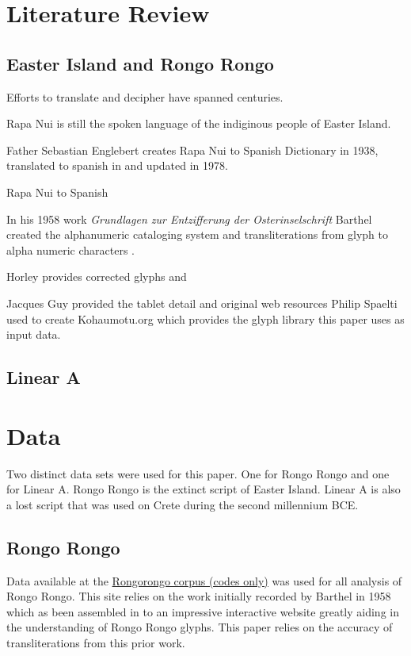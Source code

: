 \documentclass[preprint,12pt]{elsarticle}
\begin{document}
\section{Literature Review}
\label{lit}
\subsection{Easter Island and Rongo Rongo}
Efforts to translate and decipher have spanned centuries. 

Rapa Nui is still the spoken language of the indiginous people of Easter Island. \cite{}

Father Sebastian Englebert creates Rapa Nui to Spanish Dictionary in 1938, translated to spanish in and updated in 1978.\cite{englert1948diccionario}

Rapa Nui to Spanish \cite{}

In his 1958 work \emph{Grundlagen zur Entzifferung der Osterinselschrift} Barthel created the alphanumeric cataloging system and transliterations from glyph to alpha numeric characters \cite{barthel1958grundlagen}. 

Horley provides corrected glyphs and 

Jacques Guy provided the tablet detail \cite{guy_rongorongo_org} and original web resources Philip Spaelti used to create Kohaumotu.org which provides the glyph library this paper uses as input data. \cite{spaelti_2012_glyph}

\subsection{Linear A}


\section{Data}
\label{data}
Two distinct data sets were used for this paper. One for Rongo Rongo and one for Linear A. Rongo Rongo is the extinct script of Easter Island. Linear A is also a lost script that was used on Crete during the second millennium BCE.  

\subsection{Rongo Rongo}
Data available at the \href{http://kohaumotu.org/Rongorongo/Glyph_Library/glyph_variants.html}{Rongorongo corpus (codes only)}\cite{} was used for all analysis of Rongo Rongo. This site relies on the work initially recorded by Barthel in 1958 \cite{} which as been assembled in to an impressive interactive website greatly aiding in the understanding of Rongo Rongo glyphs. This paper relies on the accuracy of transliterations from this prior work. 
\end{document}
